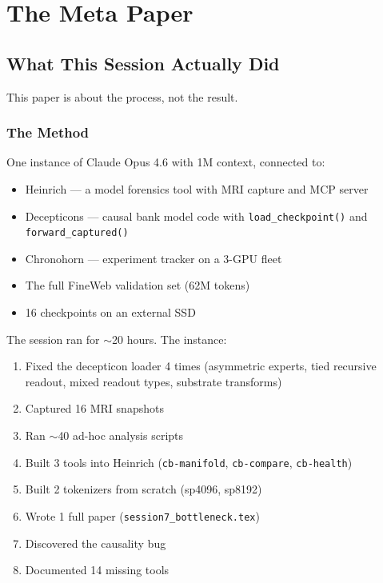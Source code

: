\documentclass[11pt,a4paper]{report}
\begin{document}
\part{The Meta Paper}

\chapter{What This Session Actually Did}

This paper is about the process, not the result.

\section{The Method}

One instance of Claude Opus 4.6 with 1M context, connected to:
\begin{itemize}[nosep]
\item Heinrich --- a model forensics tool with MRI capture and MCP server
\item Decepticons --- causal bank model code with \texttt{load\_checkpoint()} and \texttt{forward\_captured()}
\item Chronohorn --- experiment tracker on a 3-GPU fleet
\item The full FineWeb validation set (62M tokens)
\item 16 checkpoints on an external SSD
\end{itemize}

The session ran for $\sim$20 hours. The instance:
\begin{enumerate}
\item Fixed the decepticon loader 4 times (asymmetric experts, tied recursive readout, mixed readout types, substrate transforms)
\item Captured 16 MRI snapshots
\item Ran $\sim$40 ad-hoc analysis scripts
\item Built 3 tools into Heinrich (\texttt{cb-manifold}, \texttt{cb-compare}, \texttt{cb-health})
\item Built 2 tokenizers from scratch (sp4096, sp8192)
\item Wrote 1 full paper (\texttt{session7\_bottleneck.tex})
\item Discovered the causality bug
\item Documented 14 missing tools
\end{enumerate}
\end{document}
